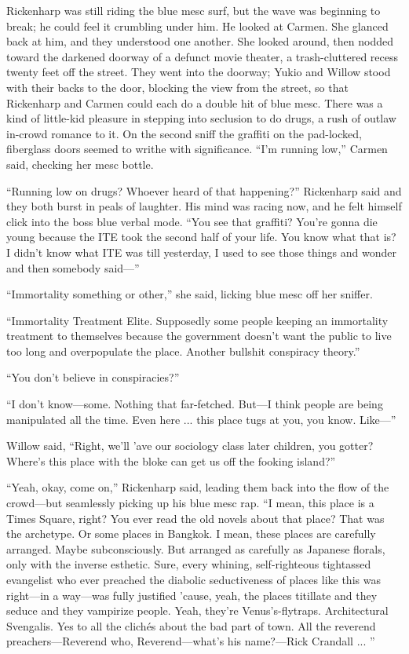 Rickenharp was still riding the blue mesc surf, but the wave was beginning to break; he could feel it crumbling under him. He looked at Carmen. She glanced back at him, and they understood one another. She looked around, then nodded toward the darkened doorway of a defunct movie theater, a trash-cluttered recess twenty feet off the street. They went into the doorway; Yukio and Willow stood with their backs to the door, blocking the view from the street, so that Rickenharp and Carmen could each do a double hit of blue mesc. There was a kind of little-kid pleasure in stepping into seclusion to do drugs, a rush of outlaw in-crowd romance to it. On the second sniff the graffiti on the pad-locked, fiberglass doors seemed to writhe with significance. ``I'm running low,'' Carmen said, checking her mesc bottle.

``Running low on drugs? Whoever heard of that happening?'' Rickenharp said and they both burst in peals of laughter. His mind was racing now, and he felt himself click into the boss blue verbal mode. ``You see that graffiti? You're gonna die young because the ITE took the second half of your life. You know what that is? I didn't know what ITE was till yesterday, I used to see those things and wonder and then somebody said—''

``Immortality something or other,'' she said, licking blue mesc off her sniffer.

``Immortality Treatment Elite. Supposedly some people keeping an immortality treatment to themselves because the government doesn't want the public to live too long and overpopulate the place. Another bullshit conspiracy theory.''

``You don't believe in conspiracies?''

``I don't know—some. Nothing that far-fetched. But—I think people are being manipulated all the time. Even here ... this place tugs at you, you know. Like—''

Willow said, ``Right, we'll 'ave our sociology class later children, you gotter? Where's this place with the bloke can get us off the fooking island?''

``Yeah, okay, come on,'' Rickenharp said, leading them back into the flow of the crowd—but seamlessly picking up his blue mesc rap. ``I mean, this place is a Times Square, right? You ever read the old novels about that place? That was the archetype. Or some places in Bangkok. I mean, these places are carefully arranged. Maybe subconsciously. But arranged as carefully as Japanese florals, only with the inverse esthetic. Sure, every whining, self-righteous tightassed evangelist who ever preached the diabolic seductiveness of places like this was right—in a way—was fully justified 'cause, yeah, the places titillate and they seduce and they vampirize people. Yeah, they're Venus's-flytraps. Architectural Svengalis. Yes to all the clichés about the bad part of town. All the reverend preachers—Reverend who, Reverend—what's his name?—Rick Crandall ... ''

